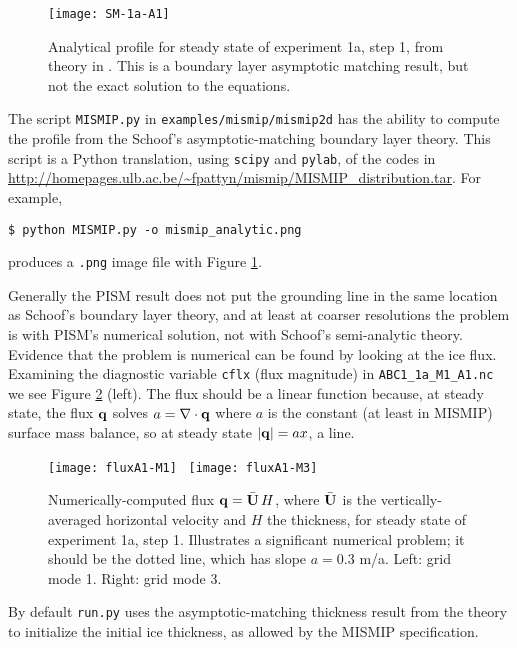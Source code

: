 \begin{figure}[ht]
\centering
\texttt{[image: SM-1a-A1]}
\caption{Analytical profile for steady state of experiment 1a, step 1, from theory in \cite{SchoofMarine1}.  This is a boundary layer asymptotic matching result, but not the exact solution to the equations.}
\label{fig:SMexper1aM1A1}
\end{figure}

The script \texttt{MISMIP.py} in \texttt{examples/mismip/mismip2d} has the ability to compute the profile from the Schoof's \cite{SchoofMarine1} asymptotic-matching boundary layer theory.  This script is a Python translation, using \texttt{scipy} and \texttt{pylab}, of the \Matlab codes in \url{http://homepages.ulb.ac.be/~fpattyn/mismip/MISMIP_distribution.tar}.  For example,

\begin{verbatim}
$ python MISMIP.py -o mismip_analytic.png
\end{verbatim}
 
\noindent produces a \verb|.png| image file with Figure \ref{fig:SMexper1aM1A1}.

Generally the PISM result does not put the grounding line in the same location as Schoof's boundary layer theory, and at least at coarser resolutions the problem is with PISM's numerical solution, not with Schoof's semi-analytic theory.  Evidence that the problem is numerical can be found by looking at the ice flux.  Examining the diagnostic variable \texttt{cflx} (flux magnitude) in \texttt{ABC1_1a_M1_A1.nc} we see Figure \ref{fig:cflx1aA1} (left).  The flux should be a linear function because, at steady state, the flux $\mathbf{q}$ solves $a=\nabla\cdot\mathbf{q}$ where $a$ is the constant (at least in MISMIP) surface mass balance, so at steady state $|\mathbf{q}| = a x$, a line.

\begin{figure}[ht]
\centering
\texttt{[image: fluxA1-M1]} \,
\texttt{[image: fluxA1-M3]}
\caption{Numerically-computed flux $\mathbf{q} = \bar{\mathbf{U}}\, H$, where $\bar{\mathbf{U}}$ is the vertically-averaged horizontal velocity and $H$ the thickness, for steady state of experiment 1a, step 1.  Illustrates a significant numerical problem; it should be the dotted line, which has slope $a = 0.3$ m/a.  Left: grid mode 1.  Right: grid mode 3.}
\label{fig:cflx1aA1}
\end{figure}

By default \texttt{run.py} uses the asymptotic-matching thickness result from the \cite{SchoofMarine1} theory to initialize the initial ice thickness, as allowed by the MISMIP specification.


